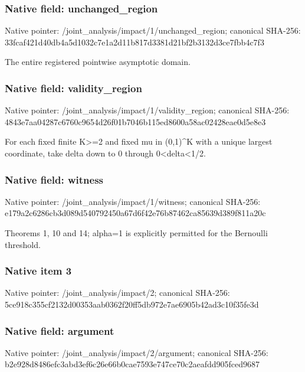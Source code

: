 \documentclass[10pt,a4paper]{article}
\begin{document}
\subsubsection{Native field: unchanged\_\allowbreak{}region}
Native pointer: /joint\_\allowbreak{}analysis/impact/1/unchanged\_\allowbreak{}region; canonical SHA-256: 33fcaf421d40db4a5d1032c7e1a2d11b817d3381d21bf2b3132d3ce7fbb4c7f3

\begingroup\raggedright\sloppy The entire registered pointwise asymptotic domain.\par\endgroup

\subsubsection{Native field: validity\_\allowbreak{}region}
Native pointer: /joint\_\allowbreak{}analysis/impact/1/validity\_\allowbreak{}region; canonical SHA-256: 4843e7aa04287c6760c9654d26f01b7046b115ed8600a58ac02428eae0d5e8e3

\begingroup\raggedright\sloppy For each fixed finite K>=\allowbreak{}2 and fixed mu in (0,\allowbreak{}1)\textasciicircum{}K with a unique largest coordinate,\allowbreak{} take delta down to 0 through 0<delta<1/\allowbreak{}2.\par\endgroup

\subsubsection{Native field: witness}
Native pointer: /joint\_\allowbreak{}analysis/impact/1/witness; canonical SHA-256: e179a2c6286cb3d089d540792450a67d6f42e76b87462ca85639d389f811a20c

\begingroup\raggedright\sloppy Theorems 1,\allowbreak{} 10 and 14;\allowbreak{} alpha=\allowbreak{}1 is explicitly permitted for the Bernoulli threshold.\par\endgroup

\subsubsection{Native item 3}
Native pointer: /joint\_\allowbreak{}analysis/impact/2; canonical SHA-256: 5ce918c355cf2132d00353aab0362f20ff5db972e7ae6905b42ad3c10f35fe3d

\subsubsection{Native field: argument}
Native pointer: /joint\_\allowbreak{}analysis/impact/2/argument; canonical SHA-256: b2e928d8486efc3abd3ef6c26e66b0cae7593e747ce70c2aeafdd905fced9687
\end{document}
